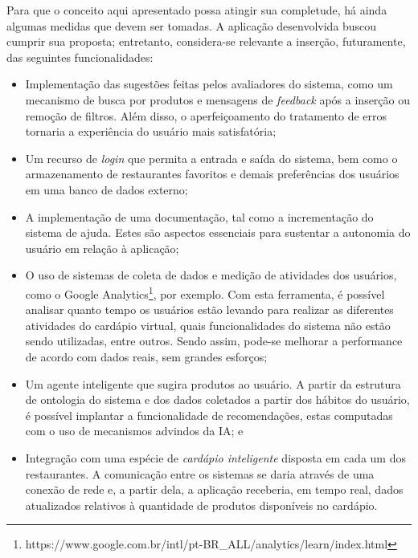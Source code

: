 Para que o conceito aqui apresentado possa atingir sua completude, há ainda algumas medidas que devem ser tomadas. A aplicação desenvolvida buscou cumprir sua proposta; entretanto, considera-se relevante a inserção, futuramente, das seguintes funcionalidades:
\begin{itemize}
	\item Implementação das sugestões feitas pelos avaliadores do sistema, como um mecanismo de busca por produtos e mensagens de \emph{feedback} após a inserção ou remoção de filtros. Além disso, o aperfeiçoamento do tratamento de erros tornaria a experiência do usuário mais satisfatória;
	\item Um recurso de \emph{login} que permita a entrada e saída do sistema, bem como o armazenamento de restaurantes favoritos e demais preferências dos usuários em uma banco de dados externo;
	\item A implementação de uma documentação, tal como a incrementação do sistema de ajuda. Estes são aspectos essenciais para sustentar a autonomia do usuário em relação à aplicação;
	\item O uso de sistemas de coleta de dados e medição de atividades dos usuários, como o Google Analytics\footnote{https://www.google.com.br/intl/pt-BR\_ALL/analytics/learn/index.html}, por exemplo. Com esta ferramenta, é possível analisar quanto tempo os usuários estão levando para realizar as diferentes atividades do cardápio virtual, quais funcionalidades do sistema não estão sendo utilizadas, entre outros. Sendo assim, pode-se melhorar a performance de acordo com dados reais, sem grandes esforços;
	\item Um agente inteligente que sugira produtos ao usuário. A partir da estrutura de ontologia do sistema e dos dados coletados a partir dos hábitos do usuário, é possível implantar a funcionalidade de recomendações, estas computadas com o uso de mecanismos advindos da IA; e
	\item Integração com uma espécie de \emph{cardápio inteligente} disposta em cada um dos restaurantes. A comunicação entre os sistemas se daria através de uma conexão de rede e, a partir dela, a aplicação receberia, em tempo real, dados atualizados relativos à quantidade de produtos disponíveis no cardápio.
\end{itemize}